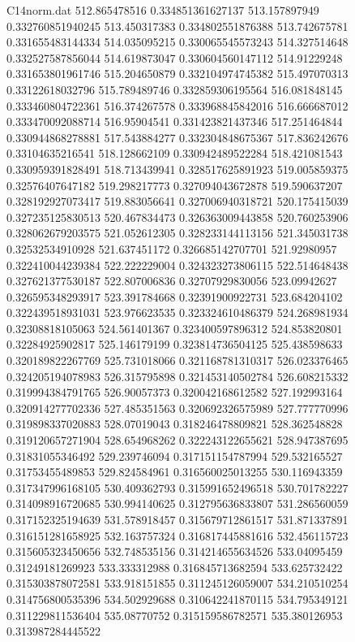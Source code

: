\begin{filecontents}{C14norm.dat}
512.865478516			0.334851361627137
513.157897949			0.332760851940245
513.450317383			0.334802551876388
513.742675781			0.331655483144334
514.035095215			0.330065545573243
514.327514648			0.332527587856044
514.619873047			0.330604560147112
514.91229248			0.331653801961746
515.204650879			0.332104974745382
515.497070313			0.33122618032796
515.789489746			0.332859306195564
516.081848145			0.333460804722361
516.374267578			0.333968845842016
516.666687012			0.333470092088714
516.95904541			0.331423821437346
517.251464844			0.330944868278881
517.543884277			0.332304848675367
517.836242676			0.33104635216541
518.128662109			0.330942489522284
518.421081543			0.330959391828491
518.713439941			0.328517625891923
519.005859375			0.32576407647182
519.298217773			0.327094043672878
519.590637207			0.328192927073417
519.883056641			0.327006940318721
520.175415039			0.327235125830513
520.467834473			0.326363009443858
520.760253906			0.328062679203575
521.052612305			0.328233144113156
521.345031738			0.32532534910928
521.637451172			0.326685142707701
521.92980957			0.322410044239384
522.222229004			0.324323273806115
522.514648438			0.327621377530187
522.807006836			0.32707929830056
523.09942627			0.326595348293917
523.391784668			0.32391900922731
523.684204102			0.322439518931031
523.976623535			0.323324610486379
524.268981934			0.32308818105063
524.561401367			0.323400597896312
524.853820801			0.32284925902817
525.146179199			0.323814736504125
525.438598633			0.320189822267769
525.731018066			0.321168781310317
526.023376465			0.324205194078983
526.315795898			0.321453140502784
526.608215332			0.319994384791765
526.90057373			0.320042168612582
527.192993164			0.320914277702336
527.485351563			0.320692326575989
527.777770996			0.319898337020883
528.07019043			0.318246478809821
528.362548828			0.319120657271904
528.654968262			0.322243122655621
528.947387695			0.31831055346492
529.239746094			0.317151154787994
529.532165527			0.31753455489853
529.824584961			0.316560025013255
530.116943359			0.317347996168105
530.409362793			0.315991652496518
530.701782227			0.314098916720685
530.994140625			0.312795636833807
531.286560059			0.317152325194639
531.578918457			0.315679712861517
531.871337891			0.316151281658925
532.163757324			0.316817445881616
532.456115723			0.315605323450656
532.748535156			0.314214655634526
533.04095459			0.31249181269923
533.333312988			0.316845713682594
533.625732422			0.315303878072581
533.918151855			0.311245126059007
534.210510254			0.314756800535396
534.502929688			0.310642241870115
534.795349121			0.311229811536404
535.08770752			0.315159586782571
535.380126953			0.313987284445522

\end{filecontents}
